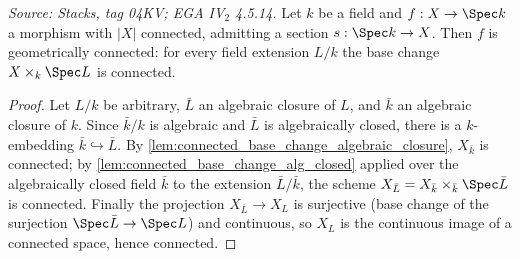 \begin{theorem}\leanok
  \label{thm:geometrically_connected_of_section}
  \textit{Source: Stacks, tag 04KV; EGA IV\(_2\) 4.5.14.}
  Let \(k\) be a field and \(f : X \to \Spec k\) a morphism with
  \(|X|\) connected, admitting a section \(s : \Spec k \to X\). Then
  \(f\) is geometrically connected: for every field extension \(L/k\)
  the base change \(X \times_k \Spec L\) is connected.
\end{theorem}
\begin{proof}
  \leanok
  Let \(L/k\) be arbitrary, \(\bar L\) an algebraic closure of \(L\),
  and \(\bar k\) an algebraic closure of \(k\). Since \(\bar k/k\) is
  algebraic and \(\bar L\) is algebraically closed, there is a
  \(k\)-embedding \(\bar k \hookrightarrow \bar L\). By
  \cref{lem:connected_base_change_algebraic_closure},
  \(X_{\bar k}\) is connected; by
  \cref{lem:connected_base_change_alg_closed} applied over the
  algebraically closed field \(\bar k\) to the extension
  \(\bar L / \bar k\), the scheme
  \(X_{\bar L} = X_{\bar k} \times_{\bar k} \Spec \bar L\) is
  connected. Finally the projection \(X_{\bar L} \to X_L\) is
  surjective (base change of the surjection
  \(\Spec \bar L \to \Spec L\)) and continuous, so \(X_L\) is the
  continuous image of a connected space, hence connected.
\end{proof}


